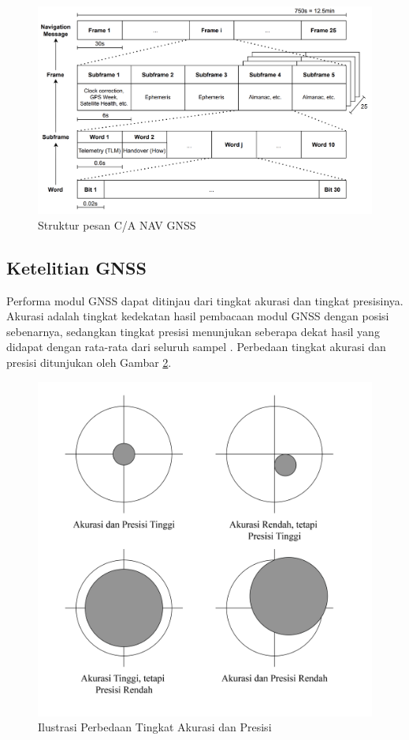 \begin{figure}[ht]
	\centering
	\includegraphics[width=13cm]{contents/chapter-2/gnss_msg_structure.png}
	\caption{Struktur pesan C/A NAV GNSS}
	\label{Fig: gnss_message_structure}
\end{figure}

\subsection{Ketelitian GNSS}
Performa modul GNSS dapat ditinjau dari tingkat akurasi dan tingkat presisinya. Akurasi adalah tingkat kedekatan hasil pembacaan modul GNSS dengan posisi sebenarnya, sedangkan tingkat presisi menunjukan seberapa dekat hasil yang didapat dengan rata-rata dari seluruh sampel \cite{Novatel2023}. Perbedaan tingkat akurasi dan presisi ditunjukan oleh Gambar \ref{Fig: acc-and-prec-diff}.

\begin{figure}[H]
	\centering
	\includegraphics[width=12cm]{contents/chapter-2/acc.png}
	\caption{Ilustrasi Perbedaan Tingkat Akurasi dan Presisi}
	\label{Fig: acc-and-prec-diff}
\end{figure}

